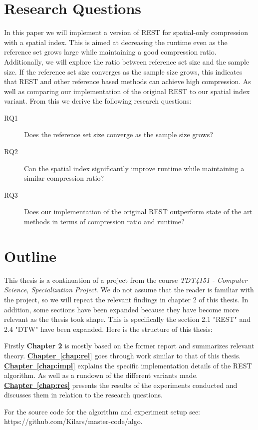 \section{Research Questions}
\label{sec:questions}
In this paper we will implement a version of REST for spatial-only compression with a spatial index. This is aimed at decreasing the runtime even as the reference set grows large while maintaining a good compression ratio. Additionally, we will explore the ratio between reference set size and the sample size. If the reference set size converges as the sample size grows, this indicates that REST and other reference based methods can achieve high compression. As well as comparing our implementation of the original REST to our spatial index variant. From this we derive the following research questions:

\begin{description}
    \item[RQ1] Does the reference set size converge as the sample size grows?
    \item[RQ2] Can the spatial index significantly improve runtime while maintaining a similar compression ratio?
    \item[RQ3] Does our implementation of the original REST outperform state of the art methods in terms of compression ratio and runtime?
\end{description}

\section{Outline}
This thesis is a continuation of a project from the course \textit{TDT4151 - Computer Science, Specialization Project}. We do not assume that the reader is familiar with the project, so we will repeat the relevant findings in chapter 2 of this thesis. In addition, some sections have been expanded because they have become more relevant as the thesis took shape. This is specifically the section 2.1 "REST" and 2.4 "DTW" have been expanded. Here is the structure of this thesis:

Firstly \textbf{Chapter 2} is mostly based on the former report and summarizes relevant theory.
\newline
\textbf{\hyperref[chap:impl]{Chapter~\ref*{chap:rel}}} goes through work similar to that of this thesis.
\newline
\textbf{\hyperref[chap:impl]{Chapter~\ref*{chap:impl}}} explains the specific implementation details of the REST algorithm. As well as a rundown of the different variants made.
\newline
\textbf{\hyperref[chap:impl]{Chapter~\ref*{chap:res}}} presents the results of the experiments conducted and discusses them in relation to the research questions.

For the source code for the algorithm and experiment setup see:\\ https://github.com/Kilars/master-code/algo.

